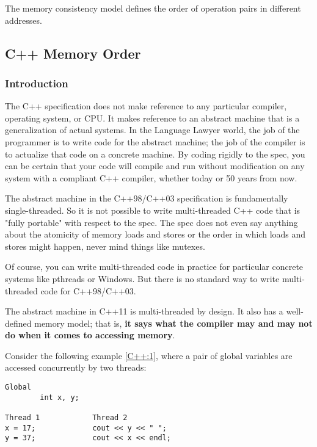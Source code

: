 The memory consistency model defines the order of operation pairs in different addresses.




\subsection{C++ Memory Order}

\subsubsection{Introduction}
The C++ specification does not make reference to any particular compiler,
 operating system, or CPU. It makes reference to an abstract machine that
  is a generalization of actual systems. In the Language Lawyer world, 
  the job of the programmer is to write code for the abstract machine;
   the job of the compiler is to actualize that code on a concrete 
   machine. By coding rigidly to the spec, you can be certain that your
    code will compile and run without modification on any system with 
    a compliant C++ compiler, whether today or 50 years from now.

The abstract machine in the C++98/C++03 specification is fundamentally 
single-threaded. So it is not possible to write multi-threaded C++ 
code that is "fully portable" with respect to the spec. The spec does 
not even say anything about the atomicity of memory loads and stores 
or the order in which loads and stores might happen, never mind things 
like mutexes.

Of course, you can write multi-threaded code in practice for particular 
concrete systems like pthreads or Windows. But there is no standard way 
to write multi-threaded code for C++98/C++03.

The abstract machine in C++11 is multi-threaded by design. It also has 
a well-defined memory model; that is, \textbf{it says what the compiler 
may and may not do when it comes to accessing memory}.

Consider the following example \ref{C++:1}, where a pair of global variables 
are accessed concurrently by two threads:


\begin{lstlisting}[label={C++:1},caption={An example about C++ memory model}]
        Global
        int x, y;

Thread 1            Thread 2
x = 17;             cout << y << " ";
y = 37;             cout << x << endl;
\end{lstlisting}


